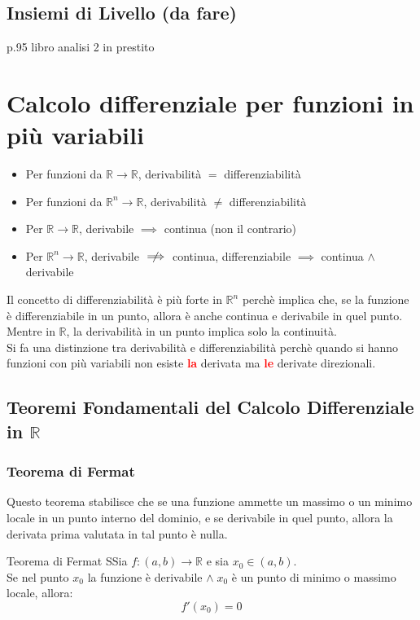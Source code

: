 \documentclass{article}  %
\begin{document}
\subsection{Insiemi di Livello (da fare)}
p.95 libro analisi 2 in prestito


\newpage
\section{Calcolo differenziale per funzioni in più variabili}
\begin{osservazioni}
	\begin{itemize}
		\item Per funzioni da $\mathbb{R} \to \mathbb{R}$, derivabilità $=$ differenziabilità
		\item Per funzioni da $\mathbb{R}^n \to \mathbb{R}$,  derivabilità $\neq$ differenziabilità
	\end{itemize}
\end{osservazioni}
\begin{osservazioni}
	\begin{itemize}
		\item Per $\mathbb{R} \to \mathbb{R}$, derivabile $\implies$ continua (non il contrario)
		\item Per $\mathbb{R}^n \to \mathbb{R}$, derivabile $\centernot{\implies}$ continua, differenziabile $\implies$ continua $\land$ derivabile
	\end{itemize}
\end{osservazioni}
Il concetto di differenziabilità è più forte in $\mathbb{R}^n$ perchè implica che, se la funzione è differenziabile in un punto, allora è anche continua e derivabile in quel punto.
Mentre in $\mathbb{R}$, la derivabilità in un punto implica solo la continuità. \\
Si fa una distinzione tra derivabilità e differenziabilità perchè quando si hanno funzioni con più variabili non esiste \textcolor{red}{\textbf{la}} derivata ma \textcolor{red}{\textbf{le}} derivate direzionali.

\subsection{Teoremi Fondamentali del Calcolo Differenziale in $\mathbb{R}$}
\subsubsection{Teorema di Fermat}
Questo teorema stabilisce che se una funzione ammette un massimo o un minimo locale in un punto interno del dominio, e se derivabile in quel punto, allora la derivata prima
valutata in tal punto è nulla. \\
\begin{theorem}{Teorema di Fermat}
	SSia $f:\left(a,b\right) \to \mathbb{R}$ e sia $x_0 \in \left(a,b\right)$. \\
	Se nel punto $x_0$ la funzione è derivabile $\land \; x_0$ è un punto di minimo o massimo locale, allora:
	\[
		f'(x_0)=0
	\]
\end{theorem}
\end{document}
